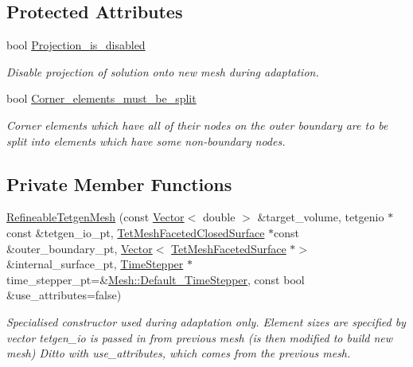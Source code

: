 \subsection*{Protected Attributes}
\begin{DoxyCompactItemize}
\item 
bool \hyperlink{classoomph_1_1RefineableTetgenMesh_a274ebedf983f3b34620fa2bbb1980fcd}{Projection\+\_\+is\+\_\+disabled}
\begin{DoxyCompactList}\small\item\em Disable projection of solution onto new mesh during adaptation. \end{DoxyCompactList}\item 
bool \hyperlink{classoomph_1_1RefineableTetgenMesh_a72b505d4bfd018471ef1543e18ae5fce}{Corner\+\_\+elements\+\_\+must\+\_\+be\+\_\+split}
\begin{DoxyCompactList}\small\item\em Corner elements which have all of their nodes on the outer boundary are to be split into elements which have some non-\/boundary nodes. \end{DoxyCompactList}\end{DoxyCompactItemize}
\subsection*{Private Member Functions}
\begin{DoxyCompactItemize}
\item 
\hyperlink{classoomph_1_1RefineableTetgenMesh_ab1c379c483f5f2a025a68683fbada666}{Refineable\+Tetgen\+Mesh} (const \hyperlink{classoomph_1_1Vector}{Vector}$<$ double $>$ \&target\+\_\+volume, tetgenio $\ast$const \&tetgen\+\_\+io\+\_\+pt, \hyperlink{classoomph_1_1TetMeshFacetedClosedSurface}{Tet\+Mesh\+Faceted\+Closed\+Surface} $\ast$const \&outer\+\_\+boundary\+\_\+pt, \hyperlink{classoomph_1_1Vector}{Vector}$<$ \hyperlink{classoomph_1_1TetMeshFacetedSurface}{Tet\+Mesh\+Faceted\+Surface} $\ast$$>$ \&internal\+\_\+surface\+\_\+pt, \hyperlink{classoomph_1_1TimeStepper}{Time\+Stepper} $\ast$time\+\_\+stepper\+\_\+pt=\&\hyperlink{classoomph_1_1Mesh_a12243d0fee2b1fcee729ee5a4777ea10}{Mesh\+::\+Default\+\_\+\+Time\+Stepper}, const bool \&use\+\_\+attributes=false)
\begin{DoxyCompactList}\small\item\em Specialised constructor used during adaptation only. Element sizes are specified by vector tetgen\+\_\+io is passed in from previous mesh (is then modified to build new mesh) Ditto with use\+\_\+attributes, which comes from the previous mesh. \end{DoxyCompactList}\end{DoxyCompactItemize}
